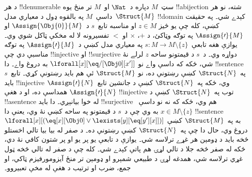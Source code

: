 \documentclass[../../../include/open-logic-section]{subfiles}
\begin{document}
\begin{explain}
د هر !!{denumerable} سټ~$M$ دپاره د~$\Nat$ او~$M$ تر منځ يوه
!!a{bijection} شته، نو هر داسې~$M$ په بالقوه ډول د معياري
مدل~$\Struct{M}$ !!{domain} کېدے شي۔ په حقيقت کښې، کله چې يو څيز
$z \in M$ او مناسبه تابع~$s$ د~$\Assign{\Obj{0}}{M}$ او
$\Assign{\prime}{M}$ په توګه وټاکئ، د $+$، $\times$ او $<$ تفسيرونه
لا له مخکې ټاکل شوي وي۔ يوازې هغه تابعې~$s\colon M \to M \setminus
\{z\}$ په معياري مدل کښې د~$\Assign{\prime}{M}$ په توګه مناسبې دي چې
!!{injective} او !!{surjective} دواړه وي۔ د~$s$ د قيمتونو ساحه
$z$ لرلے نۀ شي، ځکه که داسې واے نو
$\lforall[x][\eq/[\Obj 0][x']]$ به دروغ واے۔ دا !!{sentence}
په~$\Struct{N}$ کښې رښتونې ده، نو $\Struct{M}$ ئې هم بايد رښتونې کړي۔ تابع~$s$ بايد
!!{injective} وي، ځکه په~$\Struct{N}$ کښې د جانشين
تابع~$\Assign{\prime}{N}$ همداسې ده، او د هغې
$\Assign{\prime}{N}$ !!{injective} توب په~$\Struct{N}$ کښې د
!!a{sentence} له خوا بيانېږي۔ دا بايد
!!{surjective} هم وي، ځکه که نه نو داسې~$x \in M \setminus \{z\}$
به وي چې د~$s$ د قيمتونو په ساحه کښې نۀ وي، يعنې دا !!{sentence}
$\lforall[x][(\eq[x][\Obj 0] \lor
\lexists[y][\eq[y'][x]])]$ به په~$\Struct{M}$ کښې دروغ وي، حال دا چې
په~$\Struct{N}$ کښې رښتونې ده۔ د صفر له بيا بيا تالي اخستلو څخه بايد د ډومېن هر غړے ترلاسه شي۔
يوازې د تابعې يو پر يو او پر شتون کافي نۀ دي، ځکه له صفر څخه جلا د تالي لړۍ هم پاتې کېدے شي۔ کله چې د صفر له تالي څخه ټول غړي ترلاسه شي، همدغه لړۍ د طبيعي شمېرو او ډومېن تر منځ آيزومورفيزم ټاکي، او جمع، ضرب او ترتيب د هغې له مخې تعبيروو۔
\end{explain}
\end{document}
